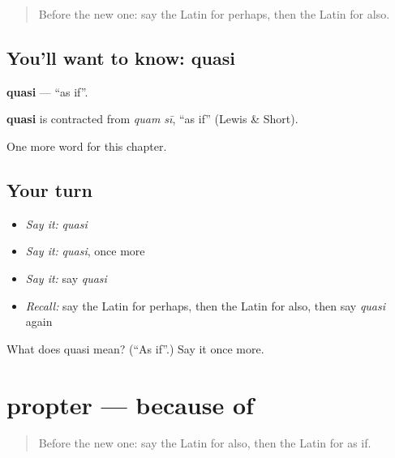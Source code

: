 \label{lesson:LA-C239-quasi}



\begin{quote}
Before the new one: say the Latin for perhaps, then the Latin for also.
\end{quote}

\subsection*{You'll want to know: quasi}
\textbf{quasi} — \textquotedblleft{}as if\textquotedblright{}.

\begin{cousinweb}
\textbf{quasi} is contracted from \emph{quam sī}, \textquotedblleft{}as if\textquotedblright{} (Lewis \& Short).
\end{cousinweb}

\begin{grammarlens}[title={What you've built}]
One more word for this chapter.
\end{grammarlens}

\subsection*{Your turn}
\begin{itemize}
\raggedright
  \item \emph{Say it:} \emph{quasi}
  \item \emph{Say it:} \emph{quasi}, once more
  \item \emph{Say it:} say \emph{quasi}
  \item \emph{Recall:} say the Latin for perhaps, then the Latin for also, then say \emph{quasi} again
\end{itemize}

\begin{tcolorbox}[breakable,colback=teal!4,colframe=teal!35!black,title={Before you move on}]
What does quasi mean? (\textquotedblleft{}As if\textquotedblright{}.) Say it once more.
\end{tcolorbox}
\section[propter]{propter — because of}

\label{lesson:LA-C239-propter}



\begin{quote}
Before the new one: say the Latin for also, then the Latin for as if.
\end{quote}

